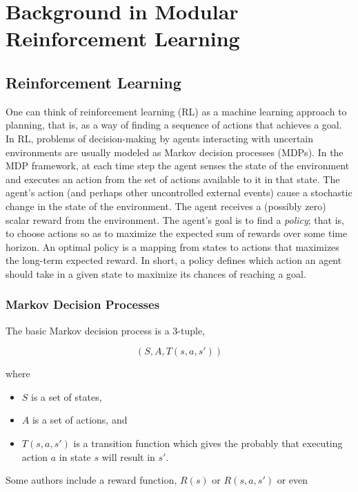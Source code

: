 \chapter{Background in Modular Reinforcement Learning}\label{ch:rl}

\section{Reinforcement Learning}

One can think of reinforcement learning (RL) \cite{sutton1998reinforcement,kaelbling1996reinforcement} as a machine learning approach to planning, that is, as a way of finding a sequence of actions that achieves a goal. In RL, problems of decision-making by agents interacting with uncertain environments are usually modeled as Markov decision processes (MDPs). In the MDP framework, at each time step the agent senses the state of the environment and executes an action from the set of actions available to it in that state. The agent's action (and perhaps other uncontrolled external events) cause a stochastic change in the state of the environment. The agent receives a (possibly zero) scalar reward from the environment. The agent's goal is to find a {\it policy}; that is, to choose actions so as to maximize the expected sum of rewards over some time horizon. An optimal policy is a mapping from states to actions that maximizes the long-term expected reward.  In short, a policy defines which action an agent should take in a given state to maximize its chances of reaching a goal.

\subsection{Markov Decision Processes}

The basic Markov decision process is a 3-tuple,

\[
(S, A, T(s, a, s'))
\]

where

\begin{itemize}
\item $S$ is a set of states,
\item $A$ is a set of actions, and
\item $T(s, a, s')$ is a transition function which gives the probably that executing action $a$ in state $s$ will result in $s'$.
\end{itemize}

Some authors include a reward function, $R(s)$ or $R(s, a, s')$ or even

